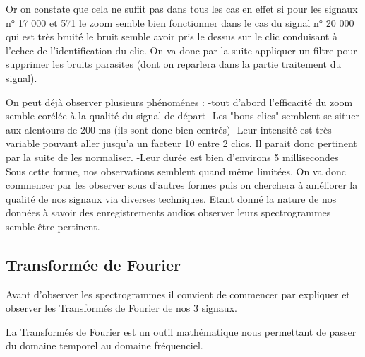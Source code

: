 Or on constate que cela ne suffit pas dans tous les cas en effet si pour les signaux n° 17 000 et 571 le zoom semble bien fonctionner dans le cas du signal n° 20 000 qui est très bruité le bruit semble avoir pris le dessus sur le clic conduisant à l'echec de l'identification du clic.
On va donc par la suite appliquer un filtre pour supprimer les bruits parasites (dont on reparlera dans la partie traitement du signal).

On peut déjà observer plusieurs phénoménes :
-tout d'abord l'efficacité du zoom semble corélée à la qualité du signal de départ
-Les "bons clics" semblent se situer aux alentours de 200 ms (ils sont donc bien centrés)
-Leur intensité est très  variable pouvant aller jusqu'a un facteur 10 entre 2 clics. Il parait donc pertinent par la suite de les normaliser.
-Leur durée est bien d'environs 5 millisecondes
Sous cette forme, nos observations semblent quand même limitées. On va donc commencer par les observer sous d'autres formes puis on cherchera à améliorer la qualité de nos signaux via diverses techniques. Etant donné la nature de nos données à savoir des enregistrements audios observer leurs spectrogrammes semble être pertinent.

\hypertarget{Transformuxe9-de-Fourier}{%
\subsection{Transformée de Fourier}
\label{Transformuxe9-de-Fourier}}

Avant d'observer les spectrogrammes il convient de commencer par expliquer et observer les Transformés de Fourier de nos 3 signaux.

La Transformés de Fourier est un outil mathématique nous permettant de passer du domaine temporel au domaine fréquenciel.


